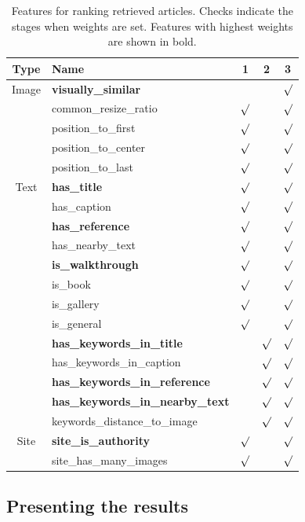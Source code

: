 \documentclass{www2010-submission}
\begin{document}
\begin{table}[t]
\centering \caption{Features for ranking retrieved 
articles. Checks
indicate the stages when weights are set. 
Features with highest weights are shown in bold.}
\label{tbl:feature_weights}
\vspace{0.2cm}

\begin{tabular}{|c|l||c|c|c|}
\hline
Type & Name & 1 & 2 & 3 \\
\hline
\hline
Image & \textbf{visually\_similar} & & & $\surd$ \\
& common\_resize\_ratio &$\surd$& & $\surd$\\
& position\_to\_first &$\surd$& & $\surd$\\
& position\_to\_center &$\surd$& & $\surd$\\
& position\_to\_last &$\surd$& & $\surd$ \\
\hline
Text & \textbf{has\_title} &$\surd$& & $\surd$ \\
& has\_caption &$\surd$& & $\surd$ \\
& \textbf{has\_reference}  &$\surd$& & $\surd$\\
& has\_nearby\_text &$\surd$& & $\surd$\\
& \textbf{is\_walkthrough} &$\surd$& & $\surd$\\
& is\_book &$\surd$& & $\surd$\\
& is\_gallery  &$\surd$& & $\surd$\\
& is\_general &$\surd$& & $\surd$\\
& \textbf{has\_keywords\_in\_title}  &&$\surd$ & $\surd$ \\
& has\_keywords\_in\_caption &&$\surd$ & $\surd$ \\
& \textbf{has\_keywords\_in\_reference} &&$\surd$ & $\surd$\\
& \textbf{has\_keywords\_in\_nearby\_text} &&$\surd$ & $\surd$\\
& keywords\_distance\_to\_image && $\surd$ & $\surd$\\
\hline
Site & \textbf{site\_is\_authority} &$\surd$& & $\surd$\\
& site\_has\_many\_images &$\surd$& & $\surd$\\
\hline

\end{tabular}
\end{table}



\subsection{Presenting the results}
\end{document}
